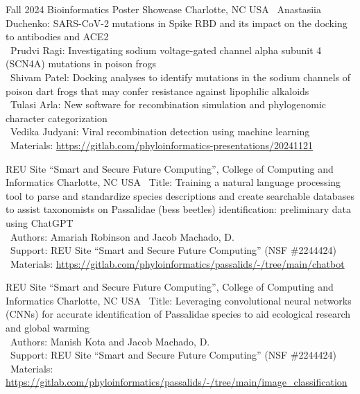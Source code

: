 \documentclass[11pt, letterpaper, sans]{moderncv}
\begin{document}
    {Fall 2024 Bioinformatics Poster Showcase}
    {Charlotte, NC}
    {USA}
    {}
    {
        \textbullet~Anastasiia Duchenko: SARS-CoV-2 mutations in Spike RBD and its impact on the docking to antibodies and ACE2\\
        \textbullet~Prudvi Ragi: Investigating sodium voltage-gated channel alpha subunit 4 (SCN4A) mutations in poison frogs\\
        \textbullet~Shivam Patel: Docking analyses to identify mutations in the sodium channels of poison dart frogs that may confer resistance against lipophilic alkaloids\\
        \textbullet~Tulasi Arla: New software for recombination simulation and phylogenomic character categorization\\
        \textbullet~Vedika Judyani: Viral recombination detection using machine learning\\
        \textbullet~Materials: \url{https://gitlab.com/phyloinformatics-presentations/20241121}
    }

    {REU Site ``Smart and Secure Future Computing'', College of Computing and Informatics}
    {Charlotte, NC}
    {USA}
    {}
    {
        \textbullet~Title: Training a natural language processing tool to parse and standardize species descriptions and create searchable databases to assist taxonomists on Passalidae (bess beetles) identification: preliminary data using ChatGPT\\
        \textbullet~Authors: Amariah Robinson and Jacob Machado, D.\\
        \textbullet~Support: REU Site ``Smart and Secure Future Computing'' (NSF \#2244424)\\
        \textbullet~Materials: \url{https://gitlab.com/phyloinformatics/passalids/-/tree/main/chatbot}
    }

\cventry{---}
    {REU Site ``Smart and Secure Future Computing'', College of Computing and Informatics}
    {Charlotte, NC}
    {USA}
    {}
    {
        \textbullet~Title: Leveraging convolutional neural networks (CNNs) for accurate identification of Passalidae species to aid ecological research and global warming\\
        \textbullet~Authors: Manish Kota and Jacob Machado, D.\\
        \textbullet~Support: REU Site ``Smart and Secure Future Computing'' (NSF \#2244424)\\
        \textbullet~Materials: \url{https://gitlab.com/phyloinformatics/passalids/-/tree/main/image_classification}
    }
\end{document}
